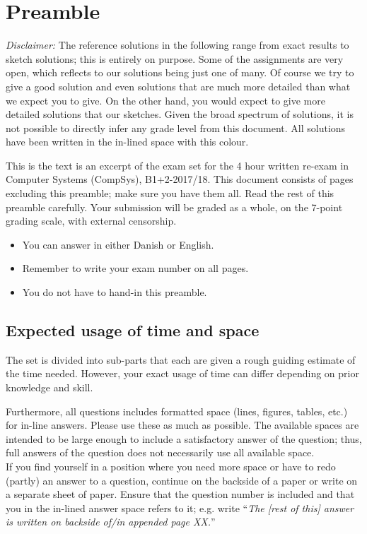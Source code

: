 

\section*{Preamble}

\begin{solution}
\emph{Disclaimer:} The reference solutions in the following range from exact results to sketch solutions; this is entirely on purpose. Some of the assignments are very open, which reflects to our solutions being just one of many. Of course we try to give a good solution and even solutions that are much more detailed than what we expect you to give. On the other hand, you would expect to give more detailed solutions that our sketches. Given the broad spectrum of solutions, it is not possible to directly infer any grade level from this document. \textcolor{solutioncolor}{All solutions have been written in the in-lined space with this colour.}
\end{solution}

This is the text is an excerpt of the exam set for the 4 hour written re-exam in Computer Systems (CompSys), B1+2-2017/18.
This document consists of \pageref{LastPage} pages excluding this preamble; make sure you have them all. Read the rest of this preamble carefully. 
Your submission will be graded as a whole, on the 7-point grading scale, with external censorship.

\begin{itemize}
  \item You can answer in either Danish or English.
  \item Remember to write your exam number on all pages.
  \item You do not have to hand-in this preamble.
\end{itemize}

\subsection*{Expected usage of time and space}
The set is divided into sub-parts that each are given a rough guiding estimate of the time needed. However, your exact usage of time can differ depending on prior knowledge and skill.

Furthermore, all questions includes formatted space (lines, figures, tables, etc.) for in-line answers. Please use these as much as possible. The available spaces are intended to be large enough to include a satisfactory answer of the question; thus, full answers of the question does not necessarily use all available space.
\\
If you find yourself in a position where you need more space or have to redo (partly) an answer to a question, continue on the backside of a paper or write on a separate sheet of paper. Ensure that the question number is included and that you in the in-lined answer space refers to it; e.g. write ``\emph{The [rest of this] answer is written on backside of/in appended page XX.}''


